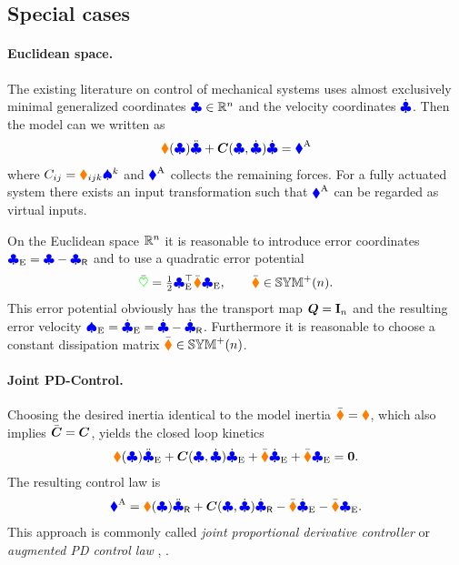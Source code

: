 \subsection{Special cases}\label{sec:ComputedTorque}
\paragraph{Euclidean space.}
The existing literature on control of mechanical systems uses almost exclusively minimal generalized coordinates $\genCoord \in \RealNum^\dimConfigSpace$ and the velocity coordinates $\genCoordd$.
Then the model can we written as
\begin{align}
 \sysInertiaMat(\genCoord) \genCoorddd + \ConnMat(\genCoord, \genCoordd) \genCoordd = \genForceImpressed 
\end{align}
where $\ConnMatCoeff{\LidxI\LidxII} = \ConnCoeffL{\LidxI}{\LidxII}{\LidxIII}\sysVelCoeff{\LidxIII}$ and $\genForceImpressed$ collects the remaining forces.
For a fully actuated system there exists an input transformation such that $\genForceImpressed$ can be regarded as virtual inputs.

On the Euclidean space $\RealNum^\dimConfigSpace$ it is reasonable to introduce error coordinates $\genCoordE = \genCoord - \genCoordR$ and to use a quadratic error potential
\begin{align}\label{eq:EuclideanMetricPotential}
 \potentialEnergyC = \tfrac{1}{2} \genCoordE^\top \sysStiffMatC \genCoordE, \qquad \sysStiffMatC \in \SymMatP(\dimConfigSpace).
\end{align}
This error potential obviously has the transport map $\sysTransportMap = \idMat[\dimConfigSpace]$ and the resulting error velocity $\sysVelE = \genCoordEd = \genCoordd - \genCoordRd$.
Furthermore it is reasonable to choose a constant dissipation matrix $\sysDissMatC \in \SymMatP(\dimConfigSpace)$.

\paragraph{Joint PD-Control.}
Choosing the desired inertia identical to the model inertia $\sysInertiaMatC = \sysInertiaMat$, which also implies $\ConnMatC = \ConnMat$, yields the closed loop kinetics
\begin{align}
 \sysInertiaMat(\genCoord) \genCoordEdd + \ConnMat(\genCoord, \genCoordd) \genCoordEd + \sysDissMatC \genCoordEd + \sysStiffMatC \genCoordE = \tuple{0}.
\end{align}
The resulting control law is
\begin{align}
 \genForceImpressed = \sysInertiaMat(\genCoord) \genCoordRdd + \ConnMat(\genCoord, \genCoordd) \genCoordRd - \sysDissMatC \genCoordEd - \sysStiffMatC \genCoordE.
\end{align} 
This approach is commonly called \textit{joint proportional derivative controller} \cite[sec.\,9.1.1]{Slotine:AppliedNonlinearControl} or \textit{augmented PD control law} \cite[sec.\,4.5.3]{Murray:Robotic}, \cite[sec.\,8.2]{Spong:RobotModelingAndControl}.

